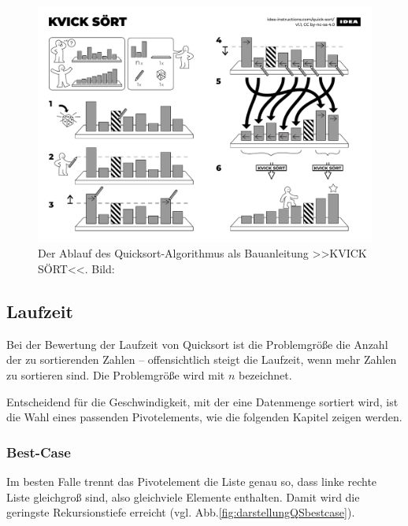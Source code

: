 \documentclass[11pt, a4paper, oneside, openright]{article}
\newcommand \vgl{vgl.\xspace }
\newcommand \Abb{Abb.\xspace }
\begin{document}
\begin{figure}[H]
    \centering
    \includegraphics[width=\textwidth]{bilder/kvicksoert.pdf}
    \caption[Bildliche Darstellung des Quicksort-Algorithmus.]{Der Ablauf des Quicksort-Algorithmus als Bauanleitung >>\MakeUppercase{Kvick Sört}<<. Bild:~\cite{ideaBauanleitung}}
    \label{fig:kvicksoert}
\end{figure}





\subsection{Laufzeit}
\label{sec:laufzeitQuicksort}
Bei der Bewertung der Laufzeit von Quicksort ist die Problemgröße die Anzahl der zu sortierenden Zahlen -- offensichtlich steigt die Laufzeit, wenn mehr Zahlen zu sortieren sind. Die Problemgröße wird mit $n$ bezeichnet.  

Entscheidend für die Geschwindigkeit, mit der eine Datenmenge sortiert wird, ist die Wahl eines passenden Pivotelements, wie die folgenden Kapitel zeigen werden.





\subsubsection{Best-Case}
Im besten Falle trennt das Pivotelement die Liste genau so, dass linke rechte Liste gleichgroß sind, also gleichviele Elemente enthalten. Damit wird die geringste Rekursionstiefe erreicht (\vgl\Abb\ref{fig:darstellungQSbestcase}). 
\end{document}
